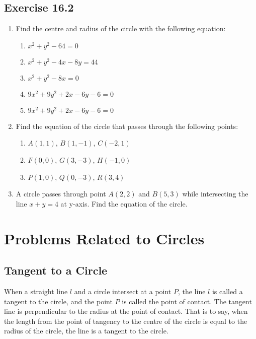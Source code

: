 \documentclass{report}
\begin{document}
\begin{multicols}{2}
    \subsection{Exercise 16.2}

    \begin{enumerate}
        \item Find the centre and radius of the circle with the following equation:
              \begin{enumerate}
                  \item $x^2+y^2-64=0$
                  \item $x^2+y^2-4x-8y=44$
                  \item $x^2+y^2-8x=0$
                  \item $9x^2+9y^2+2x-6y-6=0$
                  \item $9x^2+9y^2+2x-6y-6=0$
              \end{enumerate}
        \item Find the equation of the circle that passes through the following points:
              \begin{enumerate}
                  \item $A(1, 1)$, $B(1, -1)$, $C(-2, 1)$
                  \item $F(0, 0)$, $G(3, -3)$, $H(-1, 0)$
                  \item $P(1, 0)$, $Q(0, -3)$, $R(3, 4)$
              \end{enumerate}
        \item A circle passes through point $A(2, 2)$ and $B(5, 3)$ while intersecting the
              line $x+y=4$ at y-axis. Find the equation of the circle.
    \end{enumerate}

    \section{Problems Related to Circles}

    \subsection*{Tangent to a Circle}

    When a straight line $l$ and a circle intersect at a point $P$, the line $l$ is
    called a tangent to the circle, and the point $P$ is called the point of
    contact. The tangent line is perpendicular to the radius at the point of
    contact. That is to say, when the length from the point of tangency to the
    centre of the circle is equal to the radius of the circle, the line is a
    tangent to the circle.


\end{multicols}
\end{document}
